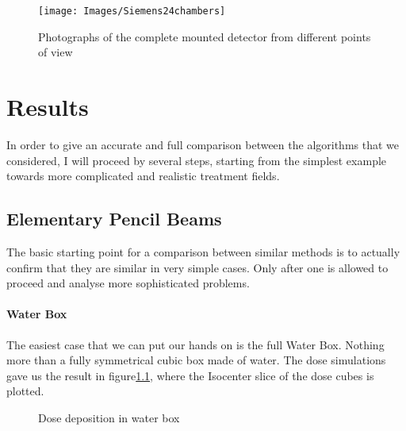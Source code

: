 \documentclass[12pt, a4paper, twoside]{book}
\begin{document}
\begin{figure}[b]
{\texttt{[image: Images/Siemens24chambers]}}
\caption{Photographs of the complete mounted detector from different points of view}
\label{fig:24cham}
\end{figure}

\chapter{Results} %
\label{chap:res}



In order to give an accurate and full comparison between the algorithms that we considered, I will proceed by several steps, starting from the simplest example towards more complicated and realistic treatment fields.




\section{Elementary Pencil Beams}
The basic starting point for a comparison between similar methods is to actually confirm that they are similar in very simple cases. Only after one is allowed to proceed and analyse more sophisticated problems. 

\subsubsection{Water Box}
The easiest case that we can put our hands on is the full Water Box. Nothing more than a fully symmetrical cubic box made of water.
The dose simulations gave us the result in figure\ref{fig:WB1}, where the Isocenter slice of the dose cubes is plotted.
\begin{figure}[!ht]
\centering
{}
\caption{Dose deposition in water box}
\label{fig:WB1}
\end{figure}
\end{document}
